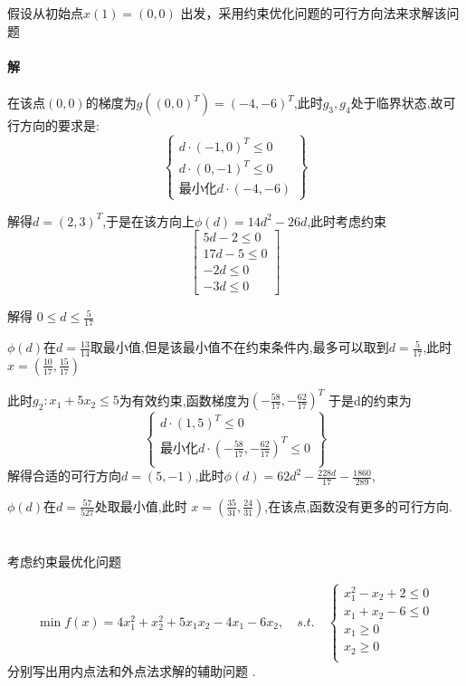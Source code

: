\documentclass[a4paper]{article}
\begin{document}
\subsection{}

假设从初始点$x(1) =(0,0)$ 出发，采用约束优化问题的可行方向法来求解该问题  

\paragraph{解}
在该点$(0,0)$的梯度为$g((0,0)^T)=(-4,-6)^T$,此时$g_3,g_4$处于临界状态,故可行方向的要求是:
\[\left\{
\begin{array}{c}
   d \cdot (-1,0)^T \leq 0\\
   d \cdot (0,-1)^T \leq 0\\
   \text{最小化} d \cdot (-4,-6)
\end{array}
\right\}\]

解得$d = (2,3)^T$,于是在该方向上$\phi(d) = 14d^2 - 26d$,此时考虑约束
\[\left[\begin{matrix}
   5 d - 2\leq 0\\17 d - 5\leq 0\\- 2 d\leq 0\\- 3 d \leq 0
\end{matrix}\right]\]

解得 $0 \leq d \leq \frac{5}{17}$

\(\phi(d)\)在$d= \frac{13}{14}$取最小值,但是该最小值不在约束条件内,最多可以取到$d=\frac{5}{17}$,此时$x = (\frac{10}{17},\frac{15}{17})$

此时$g_2: x_1 + 5x_2 \leq 5$为有效约束,函数梯度为\((- \frac{58}{17},- \frac{62}{17})^T\)
于是d的约束为
\[\left\{
\begin{array}{c}
   d \cdot (1,5)^T \leq 0\\
    \text{最小化} d \cdot (- \frac{58}{17},- \frac{62}{17})^T \leq 0\\
\end{array}
\right\}\]
解得合适的可行方向$d = (5,-1)$,此时$\phi(d) = 62 d^{2} - \frac{228 d}{17} - \frac{1860}{289}$,

$\phi(d)$在\(d = \frac{57}{527}\)处取最小值,此时 $x=(\frac{35}{31},\frac{24}{31})$,在该点,函数没有更多的可行方向.

\section{}
考虑约束最优化问题

\[\min f(x) = 4x_1^2 + x_2^2 +5x_1x_2 -4x_1 - 6x_2, \quad s.t. \quad \left\{\begin{array}{c}
    x_1^2 - x_2+2 \leq0 \\
    x_1 + x_2 -6 \leq 0 \\
    x_1 \geq 0 \\
    x_2 \geq 0 \\
\end{array}\right.\]
分别写出用内点法和外点法求解的辅助问题 .
\end{document}
